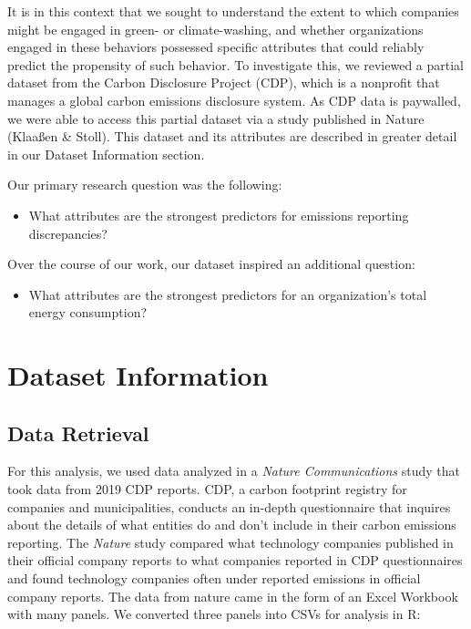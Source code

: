 \documentclass[
  12pt,
]{article}
\providecommand{\tightlist}{%
  \setlength{\itemsep}{0pt}\setlength{\parskip}{0pt}}
\begin{document}
It is in this context that we sought to understand the extent to which
companies might be engaged in green- or climate-washing, and whether
organizations engaged in these behaviors possessed specific attributes
that could reliably predict the propensity of such behavior. To
investigate this, we reviewed a partial dataset from the Carbon
Disclosure Project (CDP), which is a nonprofit that manages a global
carbon emissions disclosure system. As CDP data is paywalled, we were
able to access this partial dataset via a study published in Nature
(Klaaßen \& Stoll). This dataset and its attributes are described in
greater detail in our Dataset Information section.

Our primary research question was the following:

\begin{itemize}
\tightlist
\item
  What attributes are the strongest predictors for emissions reporting
  discrepancies?
\end{itemize}

Over the course of our work, our dataset inspired an additional
question:

\begin{itemize}
\tightlist
\item
  What attributes are the strongest predictors for an organization's
  total energy consumption?
\end{itemize}

\newpage

\hypertarget{dataset-information}{%
\section{Dataset Information}\label{dataset-information}}

\hypertarget{data-retrieval}{%
\subsection{Data Retrieval}\label{data-retrieval}}

For this analysis, we used data analyzed in a \emph{Nature
Communications} study that took data from 2019 CDP reports. CDP, a
carbon footprint registry for companies and municipalities, conducts an
in-depth questionnaire that inquires about the details of what entities
do and don't include in their carbon emissions reporting. The
\emph{Nature} study compared what technology companies published in
their official company reports to what companies reported in CDP
questionnaires and found technology companies often under reported
emissions in official company reports. The data from nature came in the
form of an Excel Workbook with many panels. We converted three panels
into CSVs for analysis in R:
\end{document}
